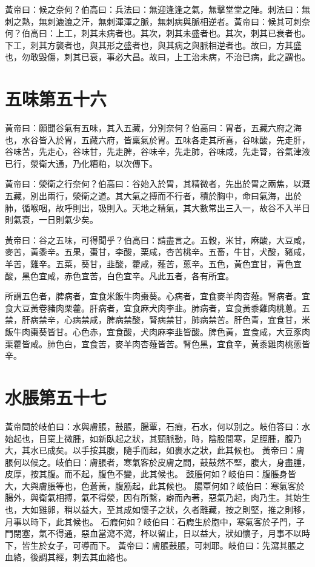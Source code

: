 黃帝曰：候之奈何？伯高曰：兵法曰：無迎逢逢之氣，無擊堂堂之陣。刺法曰：無刺之熱，無刺漉漉之汗，無刺渾渾之脈，無刺病與脈相逆者。黃帝曰：候其可刺奈何？伯高曰：上工，刺其未病者也。其次，刺其未盛者也。其次，刺其已衰者也。下工，刺其方襲者也，與其形之盛者也，與其病之與脈相逆者也。故曰，方其盛也，勿敢毀傷，刺其已衰，事必大昌。故曰，上工治未病，不治已病，此之謂也。



\section{五味第五十六}

黃帝曰：願聞谷氣有五味，其入五藏，分別奈何？伯高曰：胃者，五藏六府之海也，水谷皆入於胃，五藏六府，皆稟氣於胃。五味各走其所喜，谷味酸，先走肝，谷味苦，先走心，谷味甘，先走脾，谷味辛，先走肺，谷味咸，先走腎，谷氣津液已行，滎衛大通，乃化糟粕，以次傳下。

黃帝曰：滎衛之行奈何？伯高曰：谷始入於胃，其精微者，先出於胃之兩焦，以溉五藏，別出兩行，滎衛之道。其大氣之搏而不行者，積於胸中，命曰氣海，出於肺，循喉咽，故呼則出，吸則入。天地之精氣，其大數常出三入一，故谷不入半日則氣衰，一日則氣少矣。

黃帝曰：谷之五味，可得聞乎？伯高曰：請盡言之。五穀，米甘，麻酸，大豆咸，麥苦，黃黍辛。五果，棗甘，李酸，栗咸，杏苦桃辛。五畜，牛甘，犬酸，豬咸，羊苦，雞辛。五菜，葵甘，韭酸，藿咸，薤苦，蔥辛。五色，黃色宜甘，青色宜酸，黑色宜咸，赤色宜苦，白色宜辛。凡此五者，各有所宜。

所謂五色者，脾病者，宜食米飯牛肉棗葵。心病者，宜食麥羊肉杏薤。腎病者。宜食大豆黃卷豬肉栗藿。肝病者，宜食麻犬肉李韭。肺病者，宜食黃黍雞肉桃蔥。五禁，肝病禁辛，心病禁咸，脾病禁酸，腎病禁甘，肺病禁苦。肝色青，宜食甘，米飯牛肉棗葵皆甘。心色赤，宜食酸，犬肉麻李韭皆酸。脾色黃，宜食咸，大豆豕肉栗藿皆咸。肺色白，宜食苦，麥羊肉杏薤皆苦。腎色黑，宜食辛，黃黍雞肉桃蔥皆辛。



\section{水脹第五十七}

黃帝問於岐伯曰：水與膚脹，鼓脹，腸覃，石瘕，石水，何以別之。岐伯答曰：水始起也，目窠上微腫，如新臥起之狀，其頸脈動，時，陰股間寒，足脛腫，腹乃大，其水已成矣。以手按其腹，隨手而起，如裹水之狀，此其候也。
黃帝曰：膚脹何以候之。岐伯曰：膚脹者，寒氣客於皮膚之間，鼓鼓然不堅，腹大，身盡腫，皮厚，按其腹。而不起，腹色不變，此其候也。
鼓脹何如？岐伯曰：腹脹身皆大，大與膚脹等也，色蒼黃，腹筋起，此其候也。
腸覃何如？岐伯曰：寒氣客於腸外，與衛氣相搏，氣不得滎，因有所繫，癖而內著，惡氣乃起，肉乃生。其始生也，大如雞卵，稍以益大，至其成如懷子之狀，久者離藏，按之則堅，推之則移，月事以時下，此其候也。
石瘕何如？岐伯曰：石瘕生於胞中，寒氣客於子門，子門閉塞，氣不得通，惡血當瀉不瀉，杯以留止，日以益大，狀如懷子，月事不以時下，皆生於女子，可導而下。
黃帝曰：膚脹鼓脹，可刺耶。岐伯曰：先瀉其脹之血絡，後調其經，刺去其血絡也。

